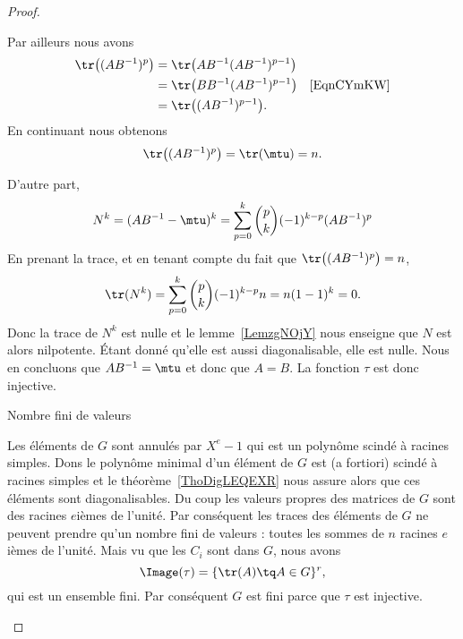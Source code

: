 \begin{proof}
\begin{subproof}
            Par ailleurs nous avons
            \begin{subequations}
                \begin{align}
                    \tr\big( (AB^{-1})^p \big)&=\tr\big( AB^{-1}(AB^{-1})^{p-1} \big)\\
                    &=\tr\big( BB^{-1}(AB^{-1})^{p-1} \big) &\text{\eqref{EqnCYmKW}}\\
                    &=\tr\big( (AB^{-1})^{p-1} \big).
                \end{align}
            \end{subequations}
            En continuant nous obtenons
            \begin{equation}
                \tr\big(  (AB^{-1})^p \big)=\tr(\mtu)=n.
            \end{equation}

            D'autre part,
            \begin{equation}
                N^k=(AB^{-1}-\mtu)^k=\sum_{p=0}^k{p\choose k}(-1)^{k-p}(AB^{-1})^p
            \end{equation}
            En prenant la trace, et en tenant compte du fait que \( \tr\big( (AB^{-1})^p \big)=n\),
            \begin{equation}
                \tr(N^k)=\sum_{p=0}^k{p\choose k}(-1)^{k-p}n=n(1-1)^k=0.
            \end{equation}
            Donc la trace de \( N^k\) est nulle et le lemme~\ref{LemzgNOjY} nous enseigne que \( N\) est alors nilpotente. Étant donné qu'elle est aussi diagonalisable, elle est nulle. Nous en concluons que \( AB^{-1}=\mtu\) et donc que \( A=B\). La fonction \( \tau\) est donc injective.

        \item[Nombre fini de valeurs]

            Les éléments de \( G\) sont annulés par \( X^e-1\) qui est un polynôme scindé à racines simples. Dons le polynôme minimal d'un élément de \( G\) est (a fortiori) scindé à racines simples et le théorème~\ref{ThoDigLEQEXR} nous assure alors que ces éléments sont diagonalisables. Du coup les valeurs propres des matrices de \( G\) sont des racines \( e\)ièmes de l'unité. Par conséquent les traces des éléments de \( G\) ne peuvent prendre qu'un nombre fini de valeurs : toutes les sommes de \( n\) racines \( e\)ièmes de l'unité. Mais vu que les \( C_i\) sont dans \( G\), nous avons
            \begin{equation}
                \Image(\tau)=\{ \tr(A)\tq A\in G \}^r,
            \end{equation}
            qui est un ensemble fini. Par conséquent \( G\) est fini parce que \( \tau\) est injective.
    \end{subproof}
\end{proof}



